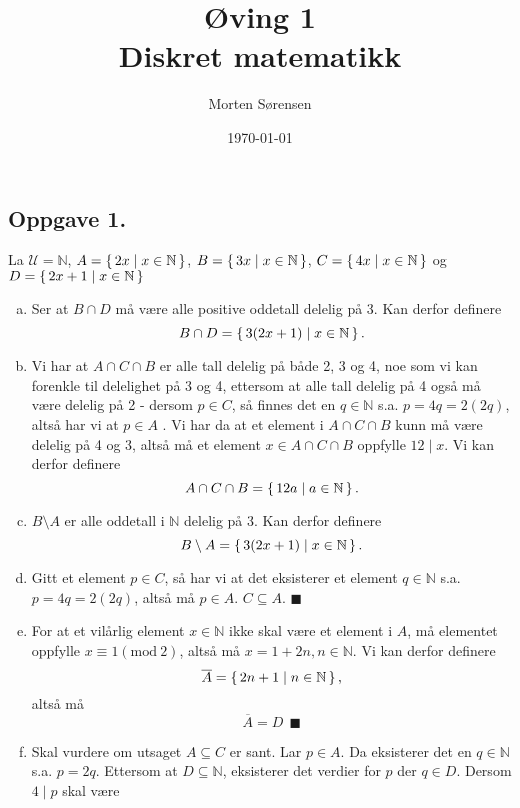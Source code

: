 \documentclass{article}
\title{\huge{Øving 1\\ Diskret matematikk}}
\author{Morten Sørensen}
\date{\today}
\begin{document}
\maketitle

\subsection*{Oppgave 1.}
La $\mathcal{U} = \mathbb{N}$, $A = \set{2x \mid x \in \mathbb{N}}$, 
$B = \set{3x \mid x \in \mathbb{N}}$, $C = \set{4x \mid x \in \mathbb{N}}$ og 
$D = \set{2x + 1 \mid x \in \mathbb{N}}$
\begin{enumerate}[(a)]
    \item {
        Ser at $B \cap D$ må være alle positive oddetall delelig på 3. Kan derfor definere 
        $$B \cap D = \set{3(2x + 1) \mid x \in \mathbb{N}}\text{.}$$
    }
    \item {
        Vi har at $A \cap C \cap B$ er alle tall delelig på både 2, 3 og 4, noe som vi kan forenkle til delelighet på 3 og 4, 
        ettersom at alle tall delelig på 4 også må være delelig på 2 - dersom $p \in C$, så finnes det en $q \in \mathbb{N}$ s.a. 
        $p = 4q = 2(2q)$, altså har vi at $p \in A$ . Vi har da at et element i $A \cap C \cap B$ kunn må være 
        delelig på 4 og 3, altså må et element $x \in A \cap C \cap B$ oppfylle $12 \mid x$. Vi kan derfor definere 
        $$A \cap C \cap B = \set{12a \mid a \in \mathbb{N}}\text{.}$$
    }
    \item {
        $B \setminus A$ er alle oddetall i $\mathbb{N}$ delelig på 3. Kan derfor definere 
        $$B \setminus A = \set{3(2x + 1) \mid x \in \mathbb{N}}\text{.}$$ 
    }
    \item {
        Gitt et element $p \in C$, så har vi at det eksisterer et element $q \in \mathbb{N}$ s.a. 
        $p = 4q = 2(2q)$, altså må $p \in A$. $C \subseteq A$. $\blacksquare$
    }
    \item {
        For at et vilårlig element $x \in \mathbb{N}$ ikke skal være et element i $A$, må elementet oppfylle 
        $x \equiv 1 (\textrm{mod}\ 2)$, altså må $x = 1 + 2n, n \in \mathbb{N}$. Vi kan derfor definere 
        $$\overline{A} = \set{2n + 1 \mid n \in \mathbb{N}}\text{,}$$
        altså må 
        $$\overline{A} = D \:\:\blacksquare$$
    }
    \item {
        Skal vurdere om utsaget $A \subseteq C$ er sant. Lar $p \in A$. Da eksisterer det en $q \in \mathbb{N}$ s.a.
        $p = 2q$. Ettersom at $D \subseteq \mathbb{N}$, eksisterer det verdier for $p$ der $q \in D$. Dersom $4 \mid p$ skal være 
}
\end{enumerate}
\end{document}
